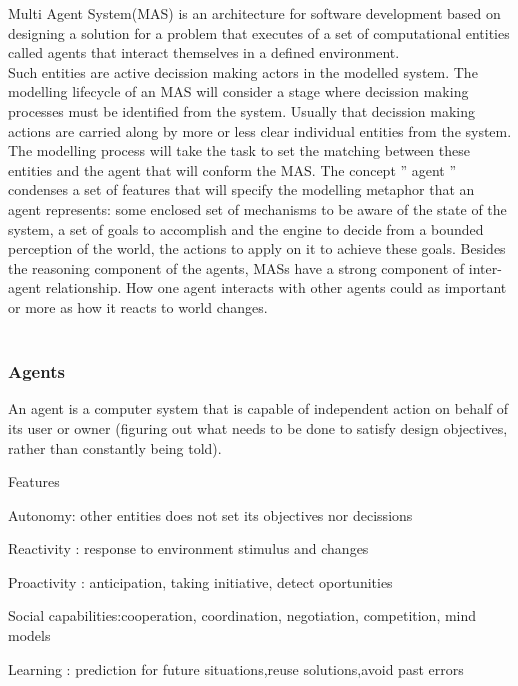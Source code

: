 \documentclass{report}
\begin{document}
Multi Agent System(MAS) is an architecture for software development based on designing a solution for a problem that 
executes of a set of computational entities called agents that interact themselves in a defined environment.\\
Such entities are active decission making actors in the modelled system. The modelling lifecycle of an MAS will consider a stage where decission making processes must be identified from the system. Usually that decission making 
actions are carried along by more or less clear individual entities from the system. The modelling process will take the task to set the matching between these entities and the agent that will conform the MAS. The concept 
'' agent '' condenses a set of features that will specify the modelling metaphor that an agent represents:
some enclosed set of mechanisms to be aware of the state of the system, a set of goals to accomplish and the engine to decide from a bounded perception of the world, the actions to apply on it to achieve these goals. Besides the reasoning component of the agents, MASs have a strong component of inter-agent relationship. How one agent interacts with other agents could as important or more as how it reacts to world changes.
\\
\\

\subsubsection{Agents}



An agent is a computer system that is capable of independent action on behalf of its user or owner
(figuring out what needs to be done to satisfy design objectives, rather than constantly being told).


\begin{description} Features
	\item Autonomy: other entities does not set its objectives nor decissions
	\item Reactivity : response to environment stimulus and changes
	\item Proactivity : anticipation, taking initiative, detect oportunities
	\item Social capabilities:cooperation, coordination, negotiation, competition, mind models
	\item Learning : prediction for future situations,reuse solutions,avoid past errors
\end{description}
\end{document}

